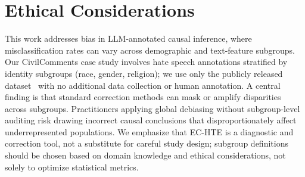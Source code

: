 \section*{Ethical Considerations}

This work addresses bias in LLM-annotated causal inference, where misclassification rates can vary across demographic and text-feature subgroups.
Our CivilComments case study involves hate speech annotations stratified by identity subgroups (race, gender, religion); we use only the publicly released dataset~\cite{borkan2019nuanced} with no additional data collection or human annotation.
A central finding is that standard correction methods can mask or amplify disparities across subgroups. Practitioners applying global debiasing without subgroup-level auditing risk drawing incorrect causal conclusions that disproportionately affect underrepresented populations.
We emphasize that EC-HTE is a diagnostic and correction tool, not a substitute for careful study design; subgroup definitions should be chosen based on domain knowledge and ethical considerations, not solely to optimize statistical metrics.
